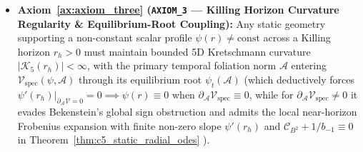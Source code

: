 \documentclass[11pt,a4paper]{article}
\newcommand{\catD}{\text{\textbf{\textcolor{blue!75!black}{[D]}}}}
\theoremstyle{definition}
\theoremstyle{plain}
\theoremstyle{remark}
\begin{document}
\begin{enumerate}[label=\arabic*.]
\begin{itemize}[leftmargin=1.1cm]
    \item \textbf{Axiom~\ref{ax:axiom_three} (\texttt{AXIOM\_3} --- Killing Horizon Curvature Regularity \& Equilibrium-Root Coupling):} Any static geometry supporting a non-constant scalar profile $\psi(r) \neq \mathrm{const}$ across a Killing horizon $r_h > 0$ must maintain bounded 5D Kretschmann curvature $|\mathcal{K}_5(r_h)| < \infty$, with the primary temporal foliation norm $\mathcal{A}$ entering $\mathcal{V}_{\mathrm{spec}}(\psi, \mathcal{A})$ through its equilibrium root $\psi_t(\mathcal{A})$ (which deductively forces $\left.\psi'(r_h)\right|_{\partial_{\mathcal{A}}\mathcal{V}=0} = 0 \implies \psi(r) \equiv 0$ when $\partial_{\mathcal{A}}\mathcal{V}_{\mathrm{spec}} \equiv 0$, while for $\partial_{\mathcal{A}}\mathcal{V}_{\mathrm{spec}} \neq 0$ it evades Bekenstein's global sign obstruction and admits the local near-horizon Frobenius expansion with finite non-zero slope $\psi'(r_h)$ and $\mathcal{C}_{B^2} + 1/b_{-1} \equiv 0$ in Theorem~\ref{thm:c5_static_radial_odes} \catD).
  \end{itemize}


\end{enumerate}
\end{document}
